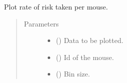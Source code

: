 \documentclass[letterpaper,10pt,english]{sphinxmanual}
\begin{document}
\begin{fulllineitems}
\label{\detokenize{NoSeMazeController/Analysis:Analysis.Performance.show_risk_per_mouse}}
\pysigstartsignatures
{}
\pysigstopsignatures
\sphinxAtStartPar
Plot rate of risk taken per mouse.
\begin{quote}\begin{description}
\item[{Parameters}] \leavevmode\begin{itemize}
\item {} 
\sphinxAtStartPar
{} () \textendash{} Data to be plotted.

\item {} 
\sphinxAtStartPar
{} () \textendash{} Id of the mouse.

\item {} 
\sphinxAtStartPar
{} () \textendash{} Bin size.

\end{itemize}

\end{description}\end{quote}

\end{fulllineitems}

\end{document}
